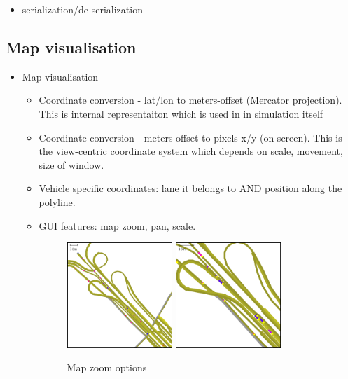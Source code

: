 \begin{itemize}
	\item serialization/de-serialization
\end{itemize}


\subsection{Map visualisation}
\begin{itemize}
    \item Map visualisation
    \begin{itemize}
        \item Coordinate conversion - lat/lon to meters-offset (Mercator projection). This is internal representaiton which is used in in simulation itself
        \item Coordinate conversion - meters-offset to pixels x/y (on-screen). This is the view-centric coordinate system which depends on scale, movement, size of window.
        \item Vehicle specific coordinates: lane it belongs to AND position along the polyline.
        \item GUI features: map zoom, pan, scale.
            \begin{figure}
                \vspace{1.5em}
                \caption{Map zoom options}
                \label{fig:mapZoomOptions}
                \centering
                \includegraphics[width=0.4\textwidth]{figs/road/zoom_dots.png}
                \hspace{0.2em}
                \includegraphics[width=0.4\textwidth]{figs/road/zoom_cars.png}
            \end{figure}

    \end{itemize}
\end{itemize}

